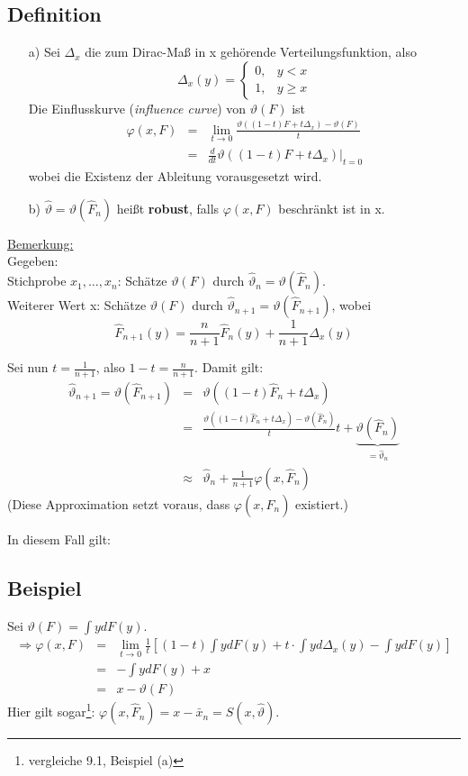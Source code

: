 \documentclass[a4paper,11pt,twoside,titlepage]{article}
\begin{document}
\subsection{Definition}
\begin{itemize}
\item[a)] Sei $\Delta_x$ die zum Dirac-Maß in x gehörende Verteilungsfunktion, also
\[\Delta_x(y)=\left\{\begin{array}{ll}0,&y<x\\1,&y\geq x\end{array}\right.\]
Die Einflusskurve (\textit{influence curve}) von $\vartheta(F)$ ist
\begin{eqnarray*}
\varphi(x,F)&=&\lim_{t\to0}\frac{\vartheta((1-t)F+t\Delta_x)-\vartheta(F)}{t}\\
&=&\frac{d}{dt}\vartheta((1-t)F+t\Delta_x)|_{t=0}
\end{eqnarray*}
wobei die Existenz der Ableitung vorausgesetzt wird.
\item[b)] $\hat\vartheta=\vartheta(\hat F_n)$ heißt \textbf{robust}, falls $\varphi(x,F)$ beschränkt ist in x.
\end{itemize}

\underline{Bemerkung:}\\
Gegeben:\\
Stichprobe $x_1,\ldots,x_n$: Schätze $\vartheta(F)$ durch $\hat\vartheta_n=\vartheta(\hat F_n)$.\\
Weiterer Wert x: Schätze $\vartheta(F)$ durch $\hat\vartheta_{n+1}=\vartheta(\hat F_{n+1})$, wobei 
\[\hat F_{n+1}(y)=\frac{n}{n+1}\hat F_n(y)+\frac{1}{n+1}\Delta_x(y)\]

Sei nun $t=\frac{1}{n+1}$, also $1-t=\frac{n}{n+1}$. Damit gilt:
\begin{eqnarray*}
\hat\vartheta_{n+1}=\vartheta(\hat F_{n+1})&=&\vartheta((1-t)\hat F_n+t\Delta_x)\\
&=&\frac{\vartheta((1-t)\hat F_n+t\Delta_x)-\vartheta(\hat F_n)}{t}t+\underbrace{\vartheta(\hat F_n)}_{=\hat\vartheta_n}\\
&\approx&\hat\vartheta_n+\frac{1}{n+1}\varphi(x,\hat F_n)\end{eqnarray*}
(Diese Approximation setzt voraus, dass $\varphi(x,\hat F_n)$ existiert.)

In diesem Fall gilt:\\

\subsection{Beispiel}
Sei $\vartheta(F)=\int ydF(y)$.
\begin{eqnarray*}
\Rightarrow \varphi(x,F)&=&\lim_{t\to0}\frac1t[(1-t)\int ydF(y)+t\cdot\int yd\Delta_x(y)-\int ydF(y)]\\
&=&-\int ydF(y)+x\\
&=&x-\vartheta(F)\end{eqnarray*}
Hier gilt sogar\footnote{vergleiche 9.1, Beispiel (a)}: $\varphi(x,\hat F_n)=x-\bar x_n=S(x,\hat\vartheta)$.
\end{document}
